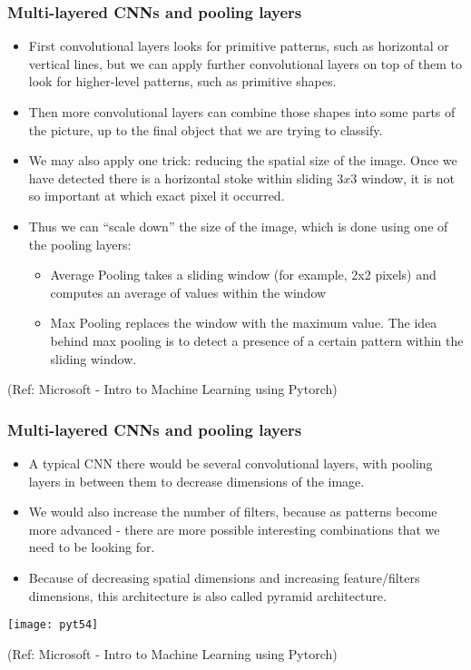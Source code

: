 \begin{frame}[fragile] \frametitle{Multi-layered CNNs and pooling layers}

\begin{itemize}

\item First convolutional layers looks for primitive patterns, such as horizontal or vertical lines, but we can apply further convolutional layers on top of them to look for higher-level patterns, such as primitive shapes. 
\item Then more convolutional layers can combine those shapes into some parts of the picture, up to the final object that we are trying to classify.
\item We may also apply one trick: reducing the spatial size of the image. Once we have detected there is a horizontal stoke within sliding $3x3$ window, it is not so important at which exact pixel it occurred. 
\item Thus we can ``scale down'' the size of the image, which is done using one of the pooling layers:
\begin{itemize}
\item Average Pooling takes a sliding window (for example, 2x2 pixels) and computes an average of values within the window
\item Max Pooling replaces the window with the maximum value. The idea behind max pooling is to detect a presence of a certain pattern within the sliding window.
\end{itemize}
\end{itemize}

\tiny{(Ref: Microsoft - Intro to Machine Learning using Pytorch)}
\end{frame}


\begin{frame}[fragile] \frametitle{Multi-layered CNNs and pooling layers}

\begin{itemize}

\item A typical CNN there would be several convolutional layers, with pooling layers in between them to decrease dimensions of the image. 
\item We would also increase the number of filters, because as patterns become more advanced - there are more possible interesting combinations that we need to be looking for.

\item Because of decreasing spatial dimensions and increasing feature/filters dimensions, this architecture is also called pyramid architecture.
\end{itemize}


\begin{center}
\texttt{[image: pyt54]}
\end{center}

\tiny{(Ref: Microsoft - Intro to Machine Learning using Pytorch)}
\end{frame}

